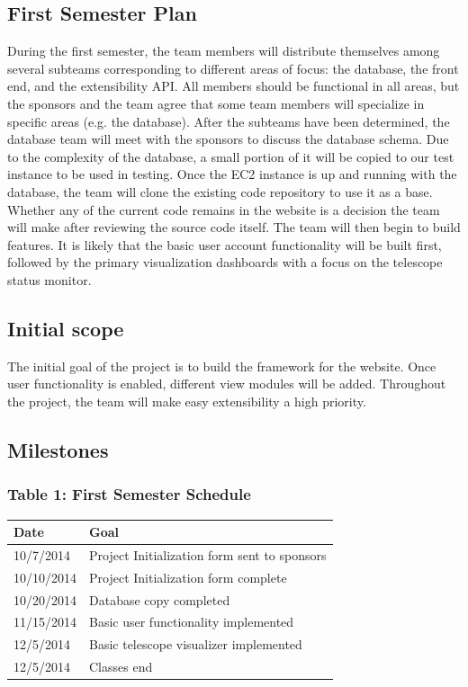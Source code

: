 \documentclass[12pt]{article}
\begin{document}
\begin{spacing}{1.5}
\newpage

\section{First Semester Plan}
During the first semester, the team members will distribute themselves among several subteams corresponding to different areas of focus: the database, the front end, and the extensibility API. All members should be functional in all areas, but the sponsors and the team agree that some team members will specialize in specific areas (e.g. the database). After the subteams have been determined, the database team will meet with the sponsors to discuss the database schema. Due to the complexity of the database, a small portion of it will be copied to our test instance to be used in testing.
\newline \newline
Once the EC2 instance is up and running with the database, the team will clone the existing code repository to use it as a base. Whether any of the current code remains in the website is a decision the team will make after reviewing the source code itself. The team will then begin to build features. It is likely that the basic user account functionality will be built first, followed by the primary visualization dashboards with a focus on the telescope status monitor.

\subsection{Initial scope}
The initial goal of the project is to build the framework for the website. Once user functionality is enabled, different view modules will be added. Throughout the project, the team will make easy extensibility a high priority.

\subsection{Milestones}
\subsubsection{Table 1: First Semester Schedule}
\begin{tabular}{l | l}
Date			&	Goal \\
\hline
10/7/2014		&	Project Initialization form sent to sponsors \\
\hline
10/10/2014		&	Project Initialization form complete \\
\hline
10/20/2014		&	Database copy completed \\
\hline
11/15/2014		&	Basic user functionality implemented \\
\hline
12/5/2014		&	Basic telescope visualizer implemented \\
\hline
12/5/2014		&	Classes end \\
\end{tabular}


\end{spacing}
\end{document}
